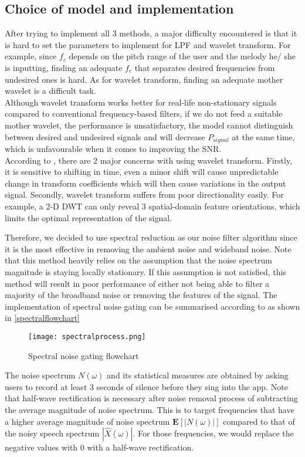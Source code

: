 \subsection{Choice of model and implementation}
After trying to implement all 3 methods, a major difficulty encountered is that it is hard to set the parameters to 
implement for LPF and wavelet transform.
For example, since $f_c$ depends on the pitch range of the user and the melody he/ she
is inputting, finding an adequate $f_c$ that separates desired frequencies from undesired ones is hard.
As for wavelet transform, finding an adequate mother wavelet is a difficult task.\\
Although wavelet transform works better for real-life non-stationary signals compared to conventional frequency-based filters, if we
do not feed a suitable mother wavelet, the performance is unsatisfactory, the model cannot distinguish between desired and undesired 
signals and will decrease $P_{signal}$ at the same time, which is unfavourable when it comes to improving the SNR.\\
According to \cite{complexwt}, there are 2 major concerns with using wavelet transform. 
Firstly, it is sensitive to shifting in time, even a minor shift will cause unpredictable change in transform coefficients which will 
then cause variations in the output signal. Secondly, wavelet transform suffers from poor directionality easily. For example, 
a 2-D DWT can only reveal 3 spatial-domain feature orientations, which limits the optimal representation of the signal. 

Therefore, we decided to use spectral reduction as our noise filter algorithm since it is the most effective in removing the ambient noise 
and wideband noise. Note that this method heavily relies on the assumption that the noise spectrum magnitude is staying locally 
stationary. If this assumption is not satisfied, this method will result in poor performance of either not being able to filter a majority of 
the broadband noise or removing the features of the signal.
The implementation of spectral noise gating can be summarised according to \cite{spectralflowchart} as shown in \autoref{spectralflowchart}
\begin{figure}
	\centering
	\texttt{[image: spectralprocess.png]}
	\caption{Spectral noise gating flowchart}
	\label{spectralflowchart}
\end{figure}
The noise spectrum $N(\omega)$ and its statistical measures are obtained by asking users to record at least 3 seconds of silence 
before they sing into the app.
Note that half-wave rectification is necessary after noise removal process of subtracting the average magnitude of noise spectrum.
This is to target frequencies that have a higher average magnitude of noise spectrum $\textbf{E}[|N(\omega)|]$ compared to that of 
the noisy speech spectrum $|\hat{X}(\omega)|$. For those frequencies, we would replace the negative values with 0 with a half-wave 
rectification.

